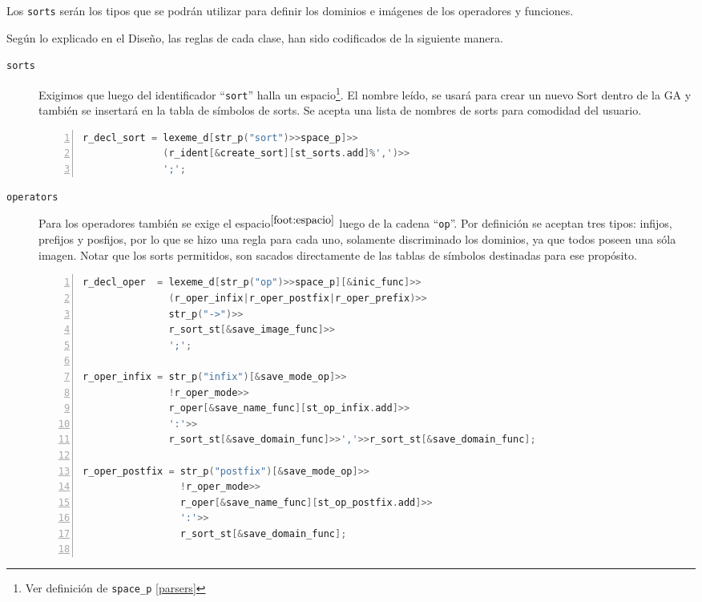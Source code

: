 Los \texttt{sorts} serán los tipos que se podrán utilizar para definir los dominios e imágenes de los operadores y funciones.

Según lo explicado en el Diseño, las reglas de cada clase, han sido codificados de la siguiente manera.

\begin{description}
\item [\texttt{sorts}] Exigimos que luego del identificador ``\texttt{sort}'' halla un espacio\footnote{\label{foot:espacio} Ver definición de \texttt{space\_p} \ref{parsers}}. El nombre leído, se usará para crear un nuevo Sort dentro de la GA y también se insertará en la tabla de símbolos de sorts. Se acepta una lista de nombres de sorts para comodidad del usuario.

\begin{lstlisting}[language=C++, basicstyle=\scriptsize, numbers=left, numbersep=5pt, numberstyle=\tiny]
r_decl_sort = lexeme_d[str_p("sort")>>space_p]>>
              (r_ident[&create_sort][st_sorts.add]%',')>>
              ';';
\end{lstlisting}

\item [\texttt{operators}] Para los operadores también se exige el espacio$^{\ref{foot:espacio}}$ luego de la cadena ``\texttt{op}''. Por definición se aceptan tres tipos: infijos, prefijos y posfijos, por lo que se hizo una regla para cada uno, solamente discriminado los dominios, ya que todos poseen una sóla imagen. Notar que los sorts permitidos, son sacados directamente de las tablas de símbolos destinadas para ese propósito.

\begin{lstlisting}[language=C++, basicstyle=\scriptsize, numbers=left, numbersep=5pt, numberstyle=\tiny]
r_decl_oper  = lexeme_d[str_p("op")>>space_p][&inic_func]>>
               (r_oper_infix|r_oper_postfix|r_oper_prefix)>>
               str_p("->")>>
               r_sort_st[&save_image_func]>>
               ';';

r_oper_infix = str_p("infix")[&save_mode_op]>>
               !r_oper_mode>>
               r_oper[&save_name_func][st_op_infix.add]>>
               ':'>>
               r_sort_st[&save_domain_func]>>','>>r_sort_st[&save_domain_func];

r_oper_postfix = str_p("postfix")[&save_mode_op]>>
                 !r_oper_mode>>
                 r_oper[&save_name_func][st_op_postfix.add]>>
                 ':'>>
                 r_sort_st[&save_domain_func];


\end{lstlisting}
\end{description}
